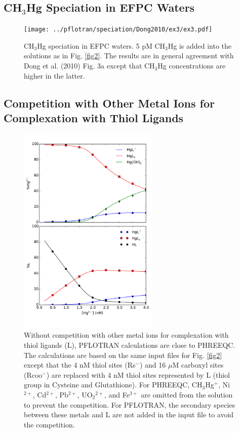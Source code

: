 \documentclass[12pt, a4paper]{article}
\begin{document}
\newpage
\subsection{CH$_3$Hg Speciation in EFPC Waters}
\begin{figure}[ht]
\centering
\texttt{[image: ../pflotran/speciation/Dong2010/ex3/ex3.pdf]}
\caption{
CH$_3$Hg speciation in EFPC waters. 5 pM CH$_3$Hg is added into the
solutions as in Fig. \ref{fig2}. The results are in general agreement with Dong
et al. (2010) Fig. 3a except that CH$_3$Hg concentrations are higher in the
latter.}
\label{fig3}
\end{figure}

\newpage
\subsection{Competition with Other Metal Ions for Complexation with Thiol Ligands}
\begin{figure}[ht]
\centering
\includegraphics[width=0.6\textwidth]{../pflotran/speciation/Dong2010/ex4/ex40.pdf}
\caption{
Without competition with other metal ions for complexation with thiol
ligands (L), PFLOTRAN calculations are close to PHREEQC.
The calculations are based on the same input files for Fig. \ref{fig2} except
that the 4 nM thiol sites (Rs$^-$) and 16 $\mu$M carboxyl sites (Rcoo$^-$) are
replaced with 4 nM thiol sites represented by L (thiol group in Cysteine and
Glutathione). For PHREEQC, CH$_3$Hg$^+$, Ni$^{2+}$, Cd$^{2+}$, Pb$^{2+}$,
UO${_2}^{2+}$, and Fe$^{3+}$ are omitted from the solution to prevent the
competition. For PFLOTRAN, the secondary species between these metals and L are
not added in the input file to avoid the competition. 
}
\label{fig40}
\end{figure}
\end{document}
